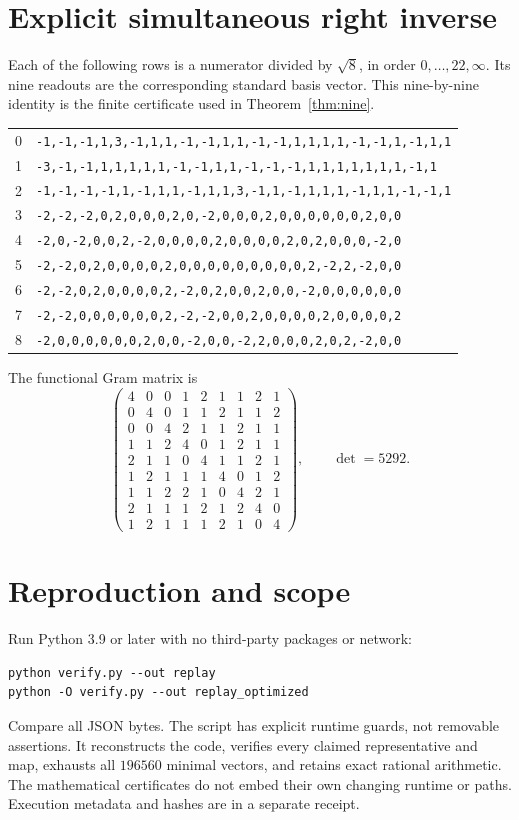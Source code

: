 \documentclass[11pt,reqno]{amsart}
\theoremstyle{definition}\newtheorem{definition}[theorem]{Definition}
\theoremstyle{remark}\newtheorem{remark}[theorem]{Remark}
\begin{document}
\section{Explicit simultaneous right inverse}\label{app:lifts}
Each of the following rows is a numerator divided by $\sqrt8$, in order $0,\ldots,22,\infty$. Its nine readouts are the corresponding standard basis vector. This nine-by-nine identity is the finite certificate used in Theorem~\ref{thm:nine}.
\begin{center}\scriptsize
\begin{tabular}{c|l}
0&\texttt{-1,-1,-1,1,3,-1,1,1,-1,-1,1,1,-1,-1,1,1,1,1,-1,-1,1,-1,1,1}\\
1&\texttt{-3,-1,-1,1,1,1,1,1,-1,-1,1,1,-1,-1,-1,1,1,1,1,1,1,1,-1,1}\\
2&\texttt{-1,-1,-1,-1,1,-1,1,1,-1,1,1,3,-1,1,-1,1,1,1,-1,1,1,-1,-1,1}\\
3&\texttt{-2,-2,-2,0,2,0,0,0,2,0,-2,0,0,0,2,0,0,0,0,0,0,2,0,0}\\
4&\texttt{-2,0,-2,0,0,2,-2,0,0,0,0,2,0,0,0,0,2,0,2,0,0,0,-2,0}\\
5&\texttt{-2,-2,0,2,0,0,0,0,2,0,0,0,0,0,0,0,0,0,2,-2,2,-2,0,0}\\
6&\texttt{-2,-2,0,2,0,0,0,0,2,-2,0,2,0,0,2,0,0,-2,0,0,0,0,0,0}\\
7&\texttt{-2,-2,0,0,0,0,0,0,2,-2,-2,0,0,2,0,0,0,0,2,0,0,0,0,2}\\
8&\texttt{-2,0,0,0,0,0,0,2,0,0,-2,0,0,-2,2,0,0,0,2,0,2,-2,0,0}
\end{tabular}
\end{center}
The functional Gram matrix is
\[
\left(\begin{smallmatrix}
4&0&0&1&2&1&1&2&1\\0&4&0&1&1&2&1&1&2\\0&0&4&2&1&1&2&1&1\\
1&1&2&4&0&1&2&1&1\\2&1&1&0&4&1&1&2&1\\1&2&1&1&1&4&0&1&2\\
1&1&2&2&1&0&4&2&1\\2&1&1&1&2&1&2&4&0\\1&2&1&1&1&2&1&0&4
\end{smallmatrix}\right),\qquad\det=5292.
\]

\section{Reproduction and scope}
Run Python 3.9 or later with no third-party packages or network:
\begin{verbatim}
python verify.py --out replay
python -O verify.py --out replay_optimized
\end{verbatim}
Compare all JSON bytes. The script has explicit runtime guards, not removable assertions. It reconstructs the code, verifies every claimed representative and map, exhausts all $196560$ minimal vectors, and retains exact rational arithmetic. The mathematical certificates do not embed their own changing runtime or paths. Execution metadata and hashes are in a separate receipt.
\end{document}
